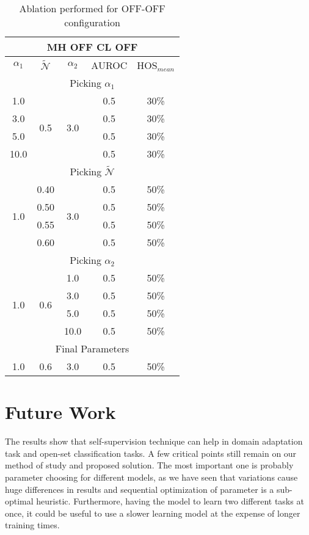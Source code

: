 \documentclass[10pt,twocolumn,letterpaper]{article}
\begin{document}
\begin{table}
  \centering
  \begin{tabular}[h]{||c|c|c|c||c||}
    \hline
    \multicolumn{5}{||c||}{MH OFF CL OFF} \\
    \hline
    $\alpha_1$ & $\mathcal{\tilde N}$ & $\alpha_2$  & AUROC & HOS$_{mean}$\\    
    \hline
    \hline
    \multicolumn{5}{||c||}{Picking $\alpha_1$} \\
    \hline
    1.0 & \multirow{4}{*}{0.5} & \multirow{4}{*}{3.0} & 0.5 & 30\% \\
    3.0 & & & 0.5 & 30\% \\
    5.0 & & & 0.5 & 30\% \\
    10.0 & & & 0.5 & 30\% \\
    \hline
    \hline
    \multicolumn{5}{||c||}{Picking $\mathcal{\tilde N}$} \\
    \hline
    \multirow{4}{*}{1.0} & 0.40 & \multirow{4}{*}{3.0} & 0.5 & 50\%\\
    & 0.50 && 0.5 & 50\% \\
    & 0.55 && 0.5 & 50\% \\
    & 0.60 && 0.5 & 50\% \\
    \hline
    \hline
    \multicolumn{5}{||c||}{Picking $\alpha_2$} \\
    \hline
    \multirow{4}{*}{1.0} & \multirow{4}{*}{0.6} & 1.0 & 0.5 & 50\%\\
    && 3.0 & 0.5 & 50\% \\
    && 5.0 & 0.5 & 50\% \\
    && 10.0 & 0.5 & 50\% \\
    \hline
    \hline
    \multicolumn{5}{||c||}{Final Parameters} \\
    \hline
    1.0 & 0.6 & 3.0 & 0.5 & 50\%\\
    \hline
  \end{tabular}
  \caption{\label{tab:ablationoffoff} Ablation performed for OFF-OFF configuration}
\end{table}
\section{Future Work}

The results show that self-supervision technique can help in domain adaptation task and open-set classification tasks.
A few critical points still remain on our method of study and proposed solution.
The most important one is probably parameter choosing for different models, as we have seen that variations cause huge differences in results and sequential optimization of parameter is a sub-optimal heuristic.
Furthermore, having the model to learn two different tasks at once, it could be useful to use a slower learning model at the expense of longer training times.

{\small


}
\end{document}
